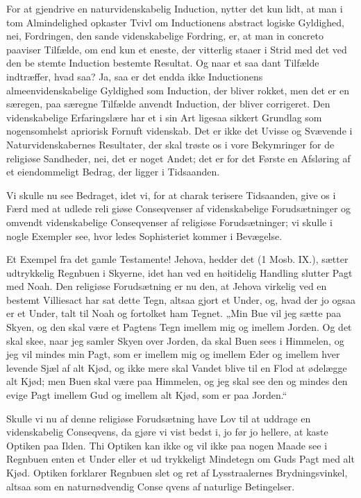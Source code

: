 \documentclass[12pt]{book}
\newcommand{\opage}[1]{\marginnote{\footnotesize\textit{[#1]}}}
\begin{document}
For at gjendrive en naturvidenskabelig Induction,
nytter det kun lidt, at man i tom Almindelighed opkaster
Tvivl om Inductionens abstract logiske Gyldighed, nei,
Fordringen, den sande videnskabelige Fordring, er, at
man in concreto paaviser Tilfælde, om end kun et eneste,
der vitterlig staaer i Strid med det ved den be\-%
\opage{62}\setcounter{footnote}{0}%
stemte Induction bestemte Resultat. Og naar et saa\-%
dant Tilfælde indtræffer, hvad saa? Ja, saa er det endda
ikke Inductionens almeenvidenskabelige Gyldighed som
Induction, der bliver rokket, men det er en særegen, paa
særegne Tilfælde anvendt Induction, der bliver corrigeret.
Den videnskabelige Erfaringslære har et i sin Art ligesaa
sikkert Grundlag som nogensomhelst apriorisk Fornuft\-%
videnskab. Det er ikke det Uvisse og Svævende i
Naturvidenskabernes Resultater, der skal trøste os i vore
Bekymringer for de religiøse Sandheder, nei, det er
noget Andet; det er for det Første en Afsløring af et
eiendommeligt Bedrag, der ligger i Tidsaanden.

Vi skulle nu see Bedraget, idet vi, for at charak\-%
terisere Tidsaanden, give os i Færd med at udlede reli\-%
giøse Conseqvenser af videnskabelige Forudsætninger
og omvendt videnskabelige Conseqvenser af religiøse
Forudsætninger; vi skulle i nogle Exempler see, hvor\-%
ledes Sophisteriet kommer i Bevægelse.

Et Exempel fra det gamle Testamente! Jehova,
hedder det (1 Mosb. IX.), sætter udtrykkelig Regnbuen i
Skyerne, idet han ved en høitidelig Handling slutter
Pagt med Noah. Den religiøse Forudsætning er nu den,
at Jehova virkelig ved en bestemt Villiesact har sat dette
Tegn, altsaa gjort et Under, og, hvad der jo ogsaa er et
Under, talt til Noah og fortolket ham Tegnet. „Min
Bue vil jeg sætte paa Skyen, og den skal være et Pagtens
Tegn imellem mig og imellem Jorden. Og det skal skee,
naar jeg samler Skyen over Jorden, da skal Buen sees
i Himmelen, og jeg vil mindes min Pagt, som er imellem
mig og imellem Eder og imellem hver levende Sjæl af
alt Kjød, og ikke mere skal Vandet blive til en Flod at
ødelægge alt Kjød; men Buen skal være paa Himmelen,
og jeg skal see den og mindes den evige Pagt imellem
Gud og imellem alt Kjød, som er paa Jorden.“

\opage{63}\setcounter{footnote}{0}%
Skulle vi nu af denne religiøse Forudsætning have
Lov til at uddrage en videnskabelig Conseqvens, da
gjøre vi vist bedst i, jo før jo hellere, at kaste Optiken
paa Ilden. Thi Optiken kan ikke og vil ikke paa nogen
Maade see i Regnbuen enten et Under eller et ud\-%
trykkeligt Mindetegn om Guds Pagt med alt Kjød.
Optiken forklarer Regnbuen slet og ret af Lysstraalernes
Brydningsvinkel, altsaa som en naturnødvendig Conse\-%
qvens af naturlige Betingelser.
\end{document}
